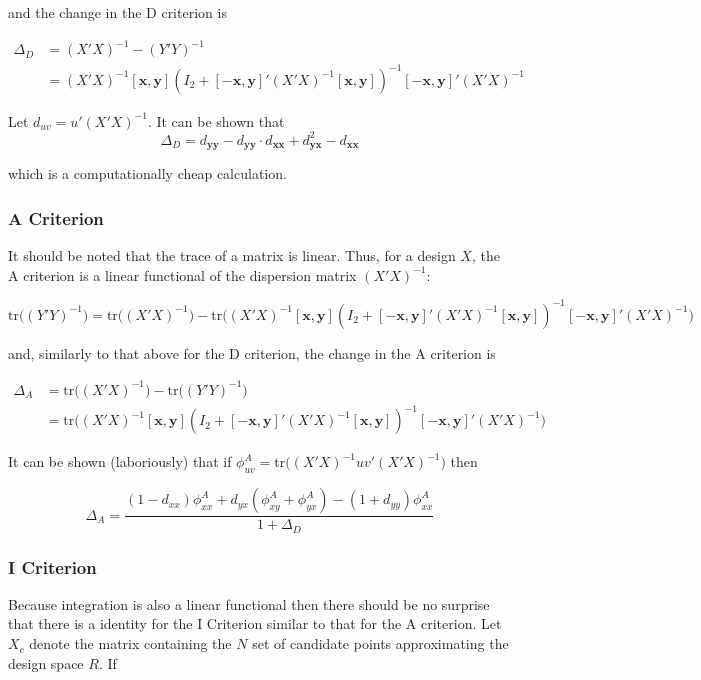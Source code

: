 \documentclass{article}\usepackage[]{graphicx}\usepackage[]{color}
\begin{document}
and the change in the D criterion is
  
\begin{align*}
  \Delta_D &= (X'X)^{-1} - (Y'Y)^{-1} \\
  &= (X'X)^{-1}[\textbf{x}, \textbf{y}] (I_2 + [-\textbf{x},\textbf{y}]' (X'X)^{-1} [\textbf{x},\textbf{y}] )^{-1} [-\textbf{x},\textbf{y}]' (X'X)^{-1}
\end{align*}

Let $d_{uv} = u' (X'X)^{-1}$. It can be shown that
$$ \Delta_D = d_{\textbf{yy}} - d_{\textbf{yy}} \cdot d_{\textbf{xx}} + d_{\textbf{yx}}^2 - d_{\textbf{xx}} $$

which is a computationally cheap calculation.

\subsubsection{A Criterion}
It should be noted that the trace of a matrix is linear. Thus, for a design $X$, the A criterion is a linear functional of the dispersion matrix $(X'X)^{-1}$:

$$ \mbox{tr}\big( (Y'Y)^{-1}\big) = \mbox{tr} \big( (X'X)^{-1} \big) - \mbox{tr} \big( (X'X)^{-1}[\textbf{x}, \textbf{y}] (I_2 + [-\textbf{x},\textbf{y}]' (X'X)^{-1} [\textbf{x},\textbf{y}] )^{-1} [-\textbf{x},\textbf{y}]' (X'X)^{-1} \big) $$

and, similarly to that above for the D criterion, the change in the A criterion is

\begin{align*}
  \Delta_A &= \mbox{tr} \big( (X'X)^{-1} \big) - \mbox{tr}\big( (Y'Y)^{-1}\big)\\
  &= \mbox{tr} \big( (X'X)^{-1}[\textbf{x}, \textbf{y}] (I_2 + [-\textbf{x},\textbf{y}]' (X'X)^{-1} [\textbf{x},\textbf{y}] )^{-1} [-\textbf{x},\textbf{y}]' (X'X)^{-1} \big)
\end{align*}

It can be shown (laboriously) that if $\phi^A_{uv} = \mbox{tr} \big( (X'X)^{-1} u v' (X'X)^{-1} \big)$ then

$$ \Delta_A = \frac{(1 - d_{xx}) \phi^A_{xx} + d_{yx} (\phi^A_{xy} + \phi^A_{yx}) - (1 + d_{yy})\phi^A_{xx}}{1 + \Delta_D} $$

\subsubsection{I Criterion}
Because integration is also a linear functional then there should be no surprise that there is a identity for the I Criterion similar to that for the A criterion. Let $X_c$ denote the matrix containing the $N$ set of candidate points approximating the design space $R$. If 
\end{document}
